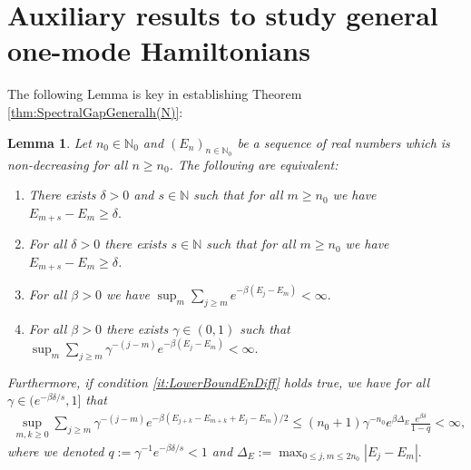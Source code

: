\documentclass[11pt]{amsart}
\newcommand{\1}{\mathbbm{1}}
\newcommand{\N}{\mathbb{N}}
\theoremstyle{plain}
\newtheorem{lemma}[theorem]{Lemma}
\theoremstyle{definition}
\theoremstyle{remark}
\numberwithin{equation}{section}
\begin{document}
\section{Auxiliary results to study general one-mode Hamiltonians}

\noindent The following Lemma is key in establishing Theorem \ref{thm:SpectralGapGeneralh(N)}:

 
\begin{lemma}
\label{lem:EnEquivalences}
Let $n_0\in\N_0$ and $(E_n)_{n\in\N_0}$ be a sequence of real numbers which is non-decreasing for all $n\ge n_0$. The following are equivalent:
\begin{enumerate}
     \item  \label{it:LowerBoundEnDiff}There exists $\delta>0$ and  $s\in\N$ such that for all $m\ge n_0$ we have $E_{m+s} - E_m\ge \delta.$
\item
\label{it:LowerBoundEnDiffstrong} For all $\delta>0$ there exists $s\in\N$ such that for all $m\ge n_0$ we have $E_{m+s} - E_m\ge \delta$.
    \item \label{it:FiniteSum}For all $\beta>0$ we have\,\,$\sup_{m} \sum_{j\ge m} e^{-\beta(E_{j}-E_m)} <\infty.$
    \item \label{it:FiniteSumGamma} For all $\beta>0$ there exists $\gamma \in(0,1)$ such that\,\, $\sup_{m} \sum_{j\ge m} \gamma^{-(j-m)}e^{-\beta(E_{j}-E_m)} <\infty.$
\end{enumerate}
Furthermore, if condition \eqref{it:LowerBoundEnDiff} holds true, we have for all $\gamma\in (e^{-\beta\delta/s},1]$ that
\begin{align}
\label{eq:ExplicitBoundGamma}
    \sup_{m,k\ge 0}\sum_{j\ge m} \gamma^{-(j-m)}e^{-\beta(E_{j+k} - E_{m+k}+E_{j} - E_m)/2}  \le 
(n_0+1)\gamma^{-n_0} e^{\beta \Delta_E} \frac{e^{\beta\delta}}{1-q}  <\infty,
\end{align}
where we denoted $q:=\gamma^{-1}e^{-\beta\delta/s}<1$ and $\Delta_E :=\max_{0\le j,m\le 2n_0} |E_j-E_m|.$

\end{lemma}
\end{document}
